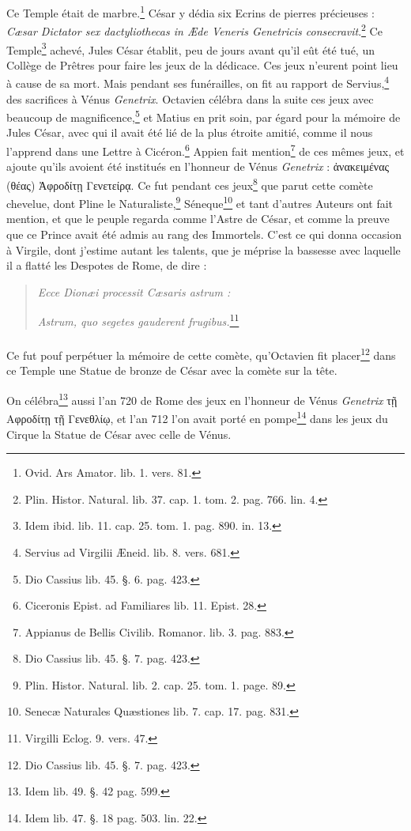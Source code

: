 \documentclass[a4paper, 18pt, oneside]{article}
\begin{document}
Ce Temple était de marbre.\footnote{Ovid. Ars Amator. lib. 1. vers. 81.} César y dédia six Ecrins de pierres précieuses : \emph{Cæsar Dictator sex dactyliothecas in Æde Veneris Genetricis consecravit}.\footnote{Plin. Histor. Natural. lib. 37. cap. 1. tom. 2. pag. 766. lin. 4.} Ce Temple\footnote{Idem ibid. lib. 11. cap. 25. tom. 1. pag. 890. in. 13.} achevé, Jules César établit, peu de jours avant qu'il eût été tué, un Collège de Prêtres pour faire les jeux de la dédicace. Ces jeux n'eurent point lieu à cause de sa mort. Mais pendant ses funérailles, on fit au rapport de Servius,\footnote{Servius ad Virgilii Æneid. lib. 8. vers. 681.} des sacrifices à Vénus \emph{Genetrix}. Octavien célébra dans la suite ces jeux avec beaucoup de magnificence,\footnote{Dio Cassius lib. 45. §. 6. pag. 423.} et Matius en prit soin, par égard pour la mémoire de Jules César, avec qui il avait été lié de la plus étroite amitié, comme il nous l'apprend dans une Lettre à Cicéron.\footnote{Ciceronis Epist. ad Familiares lib. 11. Epist. 28.} Appien fait mention\footnote{Appianus de Bellis Civilib. Romanor. lib. 3. pag. 883.} de ces mêmes jeux, et ajoute qu'ils avoient été institués en l'honneur de Vénus \emph{Genetrix} : ἀνακειμένας (θέας) Ἀφροδίτῃ Γενετείρᾳ. Ce fut pendant ces jeux\footnote{Dio Cassius lib. 45. §. 7. pag. 423.} que parut cette comète chevelue, dont Pline le Naturaliste,\footnote{Plin. Histor. Natural. lib. 2. cap. 25. tom. 1. page. 89.} Séneque\footnote{Senecæ Naturales Quæstiones lib. 7. cap. 17. pag. 831.} et tant d'autres Auteurs ont fait mention, et que le peuple regarda comme l'Astre de César, et comme la preuve que ce Prince avait été admis au rang des Immortels. C'est ce qui donna occasion à Virgile, dont j'estime autant les talents, que je méprise la bassesse avec laquelle il a flatté les Despotes de Rome, de dire :
\begin{quotation}
\emph{Ecce Dionæi processit Cæsaris astrum :}

\emph{Astrum, quo segetes gauderent frugibus.}\footnote{Virgilli Eclog. 9. vers. 47.}
\end{quotation}
\paragraph{}
Ce fut pouf perpétuer la mémoire de cette comète, qu'Octavien fit placer\footnote{Dio Cassius lib. 45. §. 7. pag. 423.} dans ce Temple une Statue de bronze de César avec la comète sur la tête.

On célébra\footnote{Idem lib. 49. §. 42 pag. 599.} aussi l'an 720 de Rome des jeux en l'honneur de Vénus \emph{Genetrix} τῇ Αφροδίτῃ τῇ Γενεθλίῳ, et l'an 712 l'on avait porté en pompe\footnote{Idem lib. 47. §. 18 pag. 503. lin. 22.} dans les jeux du Cirque la Statue de César avec celle de Vénus.
\end{document}
